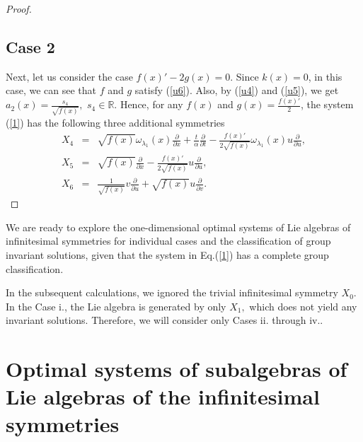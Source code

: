 \documentclass[12pt]{amsart}
\begin{document}
\begin{proof}
\subsection*{Case 2}
Next, let us consider the case $f(x)'-2g(x)=0$. Since $k(x)=0$, in this case, we can see that $f$ and $g$ satisfy (\ref{u6}). Also,  by (\ref{u4}) and (\ref{u5}), we get $a_2(x)=\frac{s_4}{\sqrt{f(x)}},$ $s_4\in \mathbb{R}$. Hence, for any $f(x)$ and $g(x)=\frac{f(x)'}{2}$, the system (\ref{1}) has the following three additional symmetries
\begin{eqnarray*}
X_4&=&\sqrt{f(x)}\omega_{\lambda_1}(x)\frac{\partial}{\partial x}+\frac{t}{\alpha}\frac{\partial}{\partial t}-\frac{f(x)'}{2\sqrt{f(x)}}\omega_{\lambda_1}(x) u 
\frac{\partial}{\partial u},\\
X_5&=&\sqrt{f(x)}\frac{\partial}{\partial x}-\frac{f(x)'}{2\sqrt{f(x)}}u\frac{\partial}{\partial u},\\    X_6&=&\frac{1}{\sqrt{f(x)}}v\frac{\partial}{\partial u}+\sqrt{f(x)}u\frac{\partial}{\partial v}.
\end{eqnarray*}
\end{proof}


We are ready to explore the one-dimensional optimal systems of Lie algebras of infinitesimal symmetries for individual cases and the classification of group invariant solutions, given that the system in Eq.(\ref{1}) has a complete group classification.

In the subsequent calculations, we ignored the trivial infinitesimal symmetry $X_0.$ In the Case i., the Lie algebra is generated by only $X_1,$ which does not yield any invariant solutions. Therefore, we will consider only Cases ii. through iv..

\section{Optimal systems of subalgebras of Lie algebras of the infinitesimal symmetries}\label{sec:RS}
\end{document}
